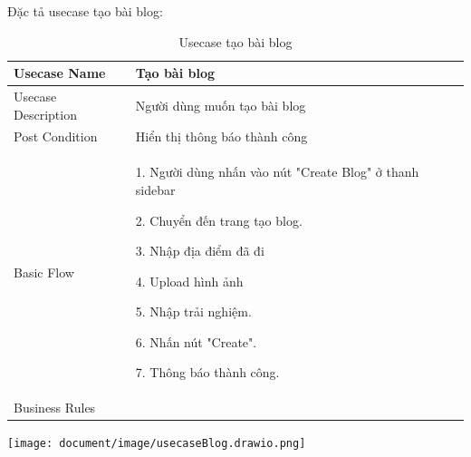 Đặc tả usecase tạo bài blog: 
\begin{table}[H]
    \centering
	\begin{tabular}{|p{5cm}|p{10cm}|}
    \hline
    Usecase Name&Tạo bài blog\\
    \hline
    Usecase Description&Người dùng muốn tạo bài blog\\
    \hline
    Post Condition&Hiển thị thông báo thành công \\
    \hline
    Basic Flow& 1. Người dùng nhấn vào nút "Create Blog" ở thanh sidebar
    
    2. Chuyển đến trang tạo blog.
    
    3. Nhập địa điểm đã đi
    
    4. Upload hình ảnh
    
    5. Nhập trải nghiệm.
    
    6. Nhấn nút "Create".
    
    7. Thông báo thành công.\\
    

    \hline Business Rules& \\
   
   
	\hline
\end{tabular}
\caption{Usecase tạo bài blog }
\end{table}
 \begin{center}
  \captionsetup{type=figure}
  \texttt{[image: document/image/usecaseBlog.drawio.png]}
\end{center}

